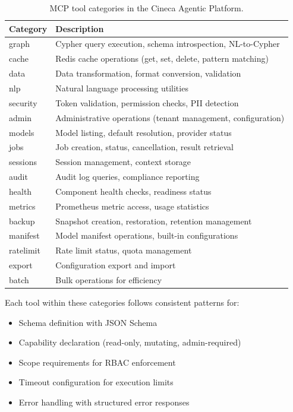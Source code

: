 \documentclass[a4paper,twoside]{sapthesis}
\begin{document}
\begin{table}[ht]
\centering
\caption{MCP tool categories in the Cineca Agentic Platform.}
\label{tab:mcp-categories}
\small
\begin{tabular}{lp{8cm}}
\hline
\textbf{Category} & \textbf{Description} \\
\midrule
graph & Cypher query execution, schema introspection, NL-to-Cypher \\
cache & Redis cache operations (get, set, delete, pattern matching) \\
data & Data transformation, format conversion, validation \\
nlp & Natural language processing utilities \\
security & Token validation, permission checks, PII detection \\
admin & Administrative operations (tenant management, configuration) \\
models & Model listing, default resolution, provider status \\
jobs & Job creation, status, cancellation, result retrieval \\
sessions & Session management, context storage \\
audit & Audit log queries, compliance reporting \\
health & Component health checks, readiness status \\
metrics & Prometheus metric access, usage statistics \\
backup & Snapshot creation, restoration, retention management \\
manifest & Model manifest operations, built-in configurations \\
ratelimit & Rate limit status, quota management \\
export & Configuration export and import \\
batch & Bulk operations for efficiency \\
\midrule
\end{tabular}
\end{table}

Each tool within these categories follows consistent patterns for:
\begin{itemize}
    \item Schema definition with JSON Schema
    \item Capability declaration (read-only, mutating, admin-required)
    \item Scope requirements for RBAC enforcement
    \item Timeout configuration for execution limits
    \item Error handling with structured error responses
\end{itemize}
\end{document}
